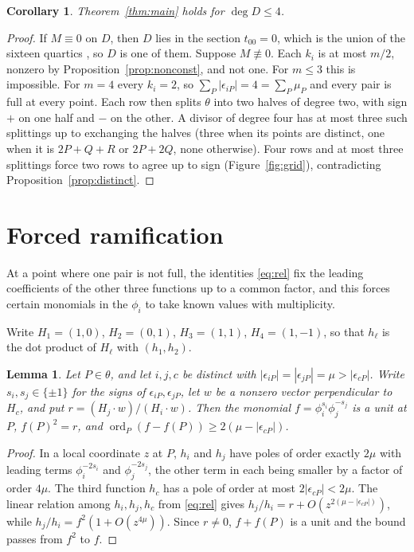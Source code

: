 \documentclass[11pt]{amsart}
\newtheorem{lemma}[theorem]{Lemma}
\newtheorem{corollary}[theorem]{Corollary}
\theoremstyle{definition}
\newcommand{\ord}{\operatorname{ord}}
\begin{document}
\begin{corollary}\label{cor:low}
Theorem~\ref{thm:main} holds for $\deg D\le4$.
\end{corollary}

\begin{proof}
If $M\equiv0$ on $D$, then $D$ lies in the section $t_{00}=0$, which is the union of the sixteen quartics
\cite{AS}, so $D$ is one of them. Suppose $M\not\equiv0$. Each $k_i$ is at most $m/2$, nonzero by
Proposition~\ref{prop:nonconst}, and not one. For $m\le3$ this is impossible. For $m=4$ every $k_i=2$, so
$\sum_P|\epsilon_{iP}|=4=\sum_P\mu_P$ and every pair is full at every point. Each row then splits $\theta$ into two
halves of degree two, with sign $+$ on one half and $-$ on the other. A divisor of degree four has at most three such
splittings up to exchanging the halves (three when its points are distinct, one when it is $2P+Q+R$ or $2P+2Q$, none
otherwise). Four rows and at most three splittings force two rows to agree up to sign
(Figure~\ref{fig:grid}), contradicting Proposition~\ref{prop:distinct}.
\end{proof}

\section{Forced ramification}\label{sec:ram}

At a point where one pair is not full, the identities \eqref{eq:rel} fix the leading coefficients of the other three
functions up to a common factor, and this forces certain monomials in the $\phi_i$ to take known values with
multiplicity.

Write $H_1=(1,0)$, $H_2=(0,1)$, $H_3=(1,1)$, $H_4=(1,-1)$, so that $h_\ell$ is the dot product of $H_\ell$ with
$(h_1,h_2)$.

\begin{lemma}\label{lem:forced}
Let $P\in\theta$, and let $i,j,c$ be distinct with $|\epsilon_{iP}|=|\epsilon_{jP}|=\mu>|\epsilon_{cP}|$. Write
$s_i,s_j\in\{\pm1\}$ for the signs of $\epsilon_{iP},\epsilon_{jP}$, let $w$ be a nonzero vector perpendicular to
$H_c$, and put $r=(H_j\cdot w)/(H_i\cdot w)$. Then the monomial $f=\phi_i^{s_i}\phi_j^{-s_j}$ is a unit at $P$,
$f(P)^2=r$, and $\ord_P(f-f(P))\ge2(\mu-|\epsilon_{cP}|)$.
\end{lemma}

\begin{proof}
In a local coordinate $z$ at $P$, $h_i$ and $h_j$ have poles of order exactly $2\mu$ with leading terms
$\phi_i^{-2s_i}$ and $\phi_j^{-2s_j}$, the other term in each being smaller by a factor of order $4\mu$. The third
function $h_c$ has a pole of order at most $2|\epsilon_{cP}|<2\mu$. The linear relation among $h_i,h_j,h_c$ from
\eqref{eq:rel} gives $h_j/h_i=r+O(z^{2(\mu-|\epsilon_{cP}|)})$, while $h_j/h_i=f^2(1+O(z^{4\mu}))$. Since $r\ne0$,
$f+f(P)$ is a unit and the bound passes from $f^2$ to $f$.
\end{proof}
\end{document}
